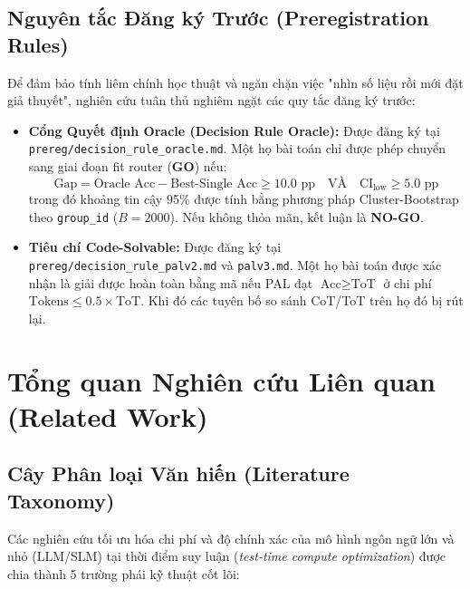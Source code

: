 \documentclass[11pt,a4paper]{report}
\begin{document}
\section{Nguyên tắc Đăng ký Trước (Preregistration Rules)}
Để đảm bảo tính liêm chính học thuật và ngăn chặn việc "nhìn số liệu rồi mới đặt giả thuyết", nghiên cứu tuân thủ nghiêm ngặt các quy tắc đăng ký trước:
\begin{itemize}[leftmargin=*]
    \item \textbf{Cổng Quyết định Oracle (Decision Rule Oracle):} Được đăng ký tại \texttt{prereg/decision\_rule\_oracle.md}. Một họ bài toán chỉ được phép chuyển sang giai đoạn fit router (\textbf{GO}) nếu:
    $$\text{Gap} = \text{Oracle Acc} - \text{Best-Single Acc} \ge 10.0\text{ pp} \quad \text{VÀ} \quad \text{CI}_{\text{low}} \ge 5.0\text{ pp}$$
    trong đó khoảng tin cậy 95\% được tính bằng phương pháp Cluster-Bootstrap theo \texttt{group\_id} ($B=2000$). Nếu không thỏa mãn, kết luận là \textbf{NO-GO}.
    \item \textbf{Tiêu chí Code-Solvable:} Được đăng ký tại \texttt{prereg/decision\_rule\_palv2.md} và \texttt{palv3.md}. Một họ bài toán được xác nhận là giải được hoàn toàn bằng mã nếu PAL đạt $\text{Acc} \ge \text{ToT}$ ở chi phí $\text{Tokens} \le 0.5\times \text{ToT}$. Khi đó các tuyên bố so sánh CoT/ToT trên họ đó bị rút lại.
\end{itemize}

\newpage

\chapter{Tổng quan Nghiên cứu Liên quan (Related Work)}

\section{Cây Phân loại Văn hiến (Literature Taxonomy)}

Các nghiên cứu tối ưu hóa chi phí và độ chính xác của mô hình ngôn ngữ lớn và nhỏ (LLM/SLM) tại thời điểm suy luận (\textit{test-time compute optimization}) được chia thành 5 trường phái kỹ thuật cốt lõi:
\end{document}
